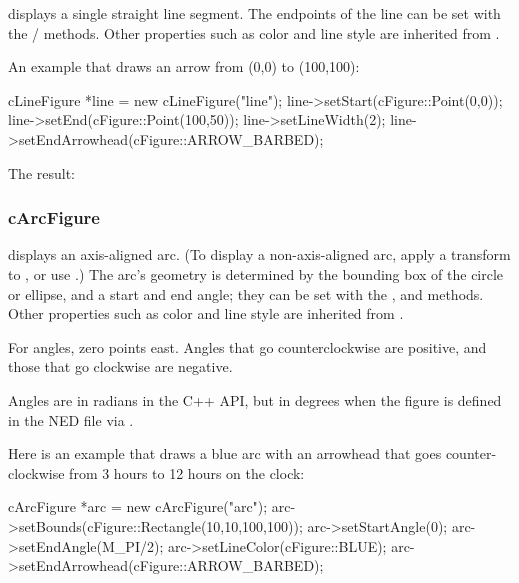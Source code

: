  displays a single straight line segment. The endpoints
of the line can be set with the /
methods. Other properties such as color and line style are inherited from
.

An example that draws an arrow from (0,0) to (100,100):

\begin{cpp}
cLineFigure *line = new cLineFigure("line");
line->setStart(cFigure::Point(0,0));
line->setEnd(cFigure::Point(100,50));
line->setLineWidth(2);
line->setEndArrowhead(cFigure::ARROW_BARBED);
\end{cpp}

The result:

\begin{center}

\end{center}


\subsubsection{cArcFigure}
\label{sec:graphics:arcfigure}

 displays an axis-aligned arc. (To display a
non-axis-aligned arc, apply a transform to , or use
.) The arc's geometry is determined by the bounding box
of the circle or ellipse, and a start and end angle; they can be set with
the ,  and 
methods. Other properties such as color and line style are inherited from
.

For angles, zero points east. Angles that go counterclockwise are
positive, and those that go clockwise are negative.

\begin{note}
Angles are in radians in the C++ API, but in degrees when the figure is
defined in the NED file via .
\end{note}

Here is an example that draws a blue arc with an arrowhead that goes
counter-clockwise from 3 hours to 12 hours on the clock:

\begin{cpp}
cArcFigure *arc = new cArcFigure("arc");
arc->setBounds(cFigure::Rectangle(10,10,100,100));
arc->setStartAngle(0);
arc->setEndAngle(M_PI/2);
arc->setLineColor(cFigure::BLUE);
arc->setEndArrowhead(cFigure::ARROW_BARBED);
\end{cpp}

